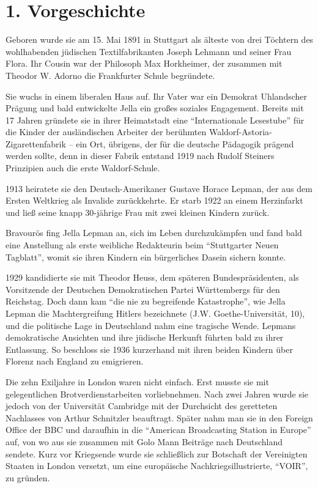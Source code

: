 \documentclass[a4paper,
fontsize=11pt,
oneside,
numbers=noperiodatend,
parskip=half-,
bibliography=totoc,
final
]{scrartcl}
\begin{document}
\section*{1. Vorgeschichte}\label{vorgeschichte}

Geboren wurde sie am 15. Mai 1891 in Stuttgart als älteste von drei
Töchtern des wohlhabenden jüdischen Textilfabrikanten Joseph Lehmann und
seiner Frau Flora. Ihr Cousin war der Philosoph Max Horkheimer, der
zusammen mit Theodor W. Adorno die Frankfurter Schule begründete.

Sie wuchs in einem liberalen Haus auf. Ihr Vater war ein Demokrat
Uhlandscher Prägung und bald entwickelte Jella ein großes soziales
Engagement. Bereits mit 17 Jahren gründete sie in ihrer Heimatstadt eine
\enquote{Internationale Lesestube} für die Kinder der ausländischen
Arbeiter der berühmten Waldorf-Astoria-Zigarettenfabrik -- ein Ort,
übrigens, der für die deutsche Pädagogik prägend werden sollte, denn in
dieser Fabrik entstand 1919 nach Rudolf Steiners Prinzipien auch die
erste Waldorf-Schule.~

1913 heiratete sie den Deutsch-Amerikaner Gustave Horace Lepman, der aus
dem Ersten Weltkrieg als Invalide zurückkehrte. Er starb 1922 an einem
Herzinfarkt und ließ seine knapp 30-jährige Frau mit zwei kleinen
Kindern zurück.

Bravourös fing Jella Lepman an, sich im Leben durchzukämpfen und fand
bald eine Anstellung als erste weibliche Redakteurin beim
\enquote{Stuttgarter Neuen Tagblatt}, womit sie ihren Kindern ein
bürgerliches Dasein sichern konnte.~

1929 kandidierte sie mit Theodor Heuss, dem späteren Bundespräsidenten,
als Vorsitzende der Deutschen Demokratischen Partei Württembergs für den
Reichstag. Doch dann kam \enquote{die nie zu begreifende Katastrophe},
wie Jella Lepman die Machtergreifung Hitlers bezeichnete (J.W.
Goethe-Universität, 10), und die politische Lage in Deutschland nahm
eine tragische Wende. Lepmans demokratische Ansichten und ihre jüdische
Herkunft führten bald zu ihrer Entlassung. So beschloss sie 1936
kurzerhand mit ihren beiden Kindern über Florenz nach England zu
emigrieren.~

Die zehn Exiljahre in London waren nicht einfach. Erst musste sie mit
gelegentlichen Brotverdienstarbeiten vorliebnehmen. Nach zwei Jahren
wurde sie jedoch von der Universität Cambridge mit der Durchsicht des
geretteten Nachlasses von Arthur Schnitzler beauftragt. Später nahm man
sie in den Foreign Office der BBC und daraufhin in die \enquote{American
Broadcasting Station in Europe} auf, von wo aus sie zusammen mit Golo
Mann Beiträge nach Deutschland sendete. Kurz vor Kriegsende wurde sie
schließlich zur Botschaft der Vereinigten Staaten in London versetzt, um
eine europäische Nachkriegsillustrierte, \enquote{VOIR}, zu gründen.~
\end{document}

